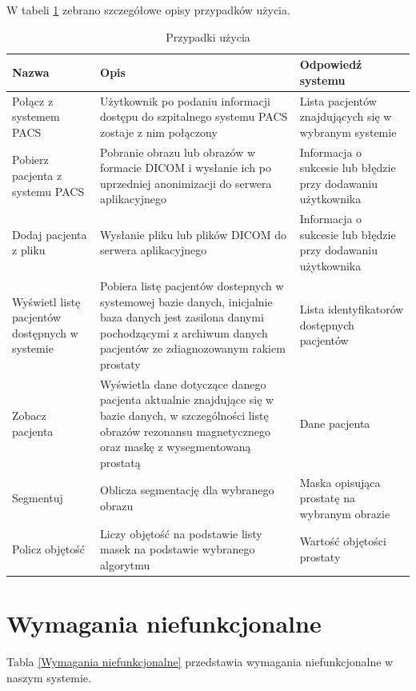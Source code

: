 \documentclass[a4paper,11pt,twoside]{report}
\theoremstyle{definition}
\begin{document}
W tabeli \ref{Przypadki użycia} zebrano szczegółowe opisy przypadków użycia.

\begin{table}[h!]
\caption{Przypadki użycia}
\centering
\begin{tabular}{|p{3cm}|p{7cm}|p{6cm}|} \hline 
	Nazwa & Opis & Odpowiedź systemu \\ \hline 
	Połącz z systemem PACS & Użytkownik po podaniu informacji dostępu do szpitalnego systemu PACS zostaje z nim połączony & Lista pacjentów znajdujących się w wybranym systemie \\ \hline 
	Pobierz pacjenta z systemu PACS & Pobranie obrazu lub obrazów w formacie DICOM i wysłanie ich po uprzedniej anonimizacji do serwera aplikacyjnego & Informacja o sukcesie lub błędzie przy dodawaniu użytkownika \\ \hline 
	Dodaj pacjenta z pliku & Wysłanie pliku lub plików DICOM do serwera aplikacyjnego & Informacja o sukcesie lub błędzie przy dodawaniu użytkownika \\ \hline 
	Wyświetl listę pacjentów dostępnych w systemie & Pobiera listę pacjentów dostepnych w systemowej bazie danych, inicjalnie baza danych jest zasilona danymi pochodzącymi z archiwum danych pacjentów ze zdiagnozowanym rakiem prostaty & Lista identyfikatorów dostępnych pacjentów \\ \hline 
	Zobacz pacjenta & Wyświetla dane dotyczące danego pacjenta aktualnie znajdujące się w bazie danych, w szczególności listę obrazów rezonansu magnetycznego oraz maskę z wysegmentowaną prostatą & Dane pacjenta \\ \hline 
	Segmentuj & Oblicza segmentację dla wybranego obrazu & Maska opisująca prostatę na wybranym obrazie \\ \hline 
	Policz objętość & Liczy objętość na podstawie listy masek na podstawie wybranego algorytmu & Wartość objętości prostaty\\ \hline 
\end{tabular}
\label{Przypadki użycia}
\end{table}

\section{Wymagania niefunkcjonalne}

Tabla \ref{Wymagania niefunkcjonalne} przedstawia wymagania niefunkcjonalne w naszym systemie.
\end{document}

